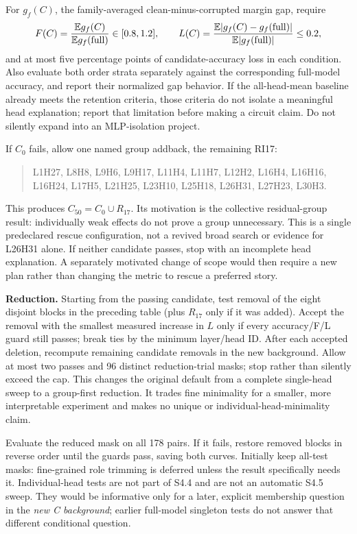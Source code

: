 For $g_f(C)$, the family-averaged clean-minus-corrupted margin gap, require
\[
F(C)=\frac{\mathbb{E} g_f(C)}{\mathbb{E} g_f(\mathrm{full})}\in[0.8,1.2],\qquad
L(C)=\frac{\mathbb{E}|g_f(C)-g_f(\mathrm{full})|}{\mathbb{E}|g_f(\mathrm{full})|}\le0.2,
\]
and at most five percentage points of candidate-accuracy loss in each condition. Also evaluate both order strata separately against the corresponding full-model accuracy, and report their normalized gap behavior. If the all-head-mean baseline already meets the retention criteria, those criteria do not isolate a meaningful head explanation; report that limitation before making a circuit claim. Do not silently expand into an MLP-isolation project.

If $C_0$ fails, allow one named group addback, the remaining RI17:
\begin{quote}\small
L1H27, L8H8, L9H6, L9H17, L11H4, L11H7, L12H2, L16H4, L16H16, L16H24, L17H5, L21H25, L23H10, L25H18, L26H31, L27H23, L30H3.
\end{quote}
This produces $C_{50}=C_0\cup R_{17}$. Its motivation is the collective residual-group result: individually weak effects do not prove a group unnecessary. This is a single predeclared rescue configuration, not a revived broad search or evidence for L26H31 alone. If neither candidate passes, stop with an incomplete head explanation. A separately motivated change of scope would then require a new plan rather than changing the metric to rescue a preferred story.

\textbf{Reduction.} Starting from the passing candidate, test removal of the eight disjoint blocks in the preceding table (plus $R_{17}$ only if it was added). Accept the removal with the smallest measured increase in $L$ only if every accuracy/F/L guard still passes; break ties by the minimum layer/head ID. After each accepted deletion, recompute remaining candidate removals in the new background. Allow at most two passes and 96 distinct reduction-trial masks; stop rather than silently exceed the cap. This changes the original default from a complete single-head sweep to a group-first reduction. It trades fine minimality for a smaller, more interpretable experiment and makes no unique or individual-head-minimality claim.

Evaluate the reduced mask on all 178 pairs. If it fails, restore removed blocks in reverse order until the guards pass, saving both curves. Initially keep all-test masks: fine-grained role trimming is deferred unless the result specifically needs it. Individual-head tests are not part of S4.4 and are not an automatic S4.5 sweep. They would be informative only for a later, explicit membership question in the \emph{new C background}; earlier full-model singleton tests do not answer that different conditional question.

